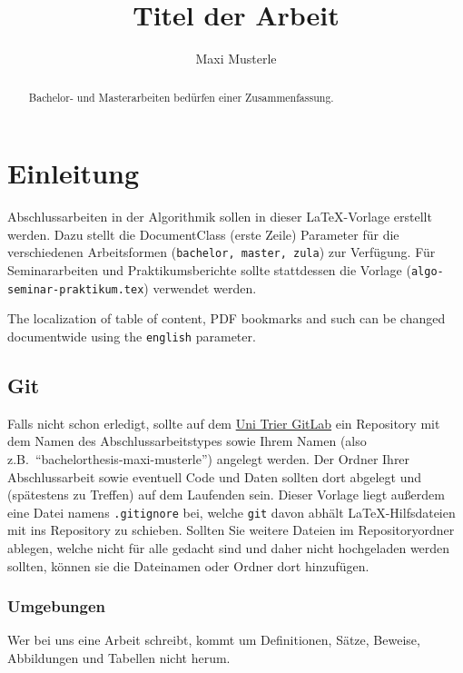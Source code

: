 \documentclass[bachelor,german]{algothesis}
\title{Titel der Arbeit} %
\author{Maxi Musterle} %
\begin{document}
\begin{abstract}
	Bachelor- und Masterarbeiten bedürfen einer Zusammenfassung.
\end{abstract}



\thesistableofcontents




\chapter{Einleitung}
Abschlussarbeiten in der Algorithmik sollen in dieser \LaTeX{}-Vorlage erstellt werden.
Dazu stellt die DocumentClass (erste Zeile) Parameter für die verschiedenen Arbeitsformen
(\verb+bachelor, master, zula+) 
zur Verfügung.
Für Seminararbeiten und Praktikumsberichte sollte stattdessen die Vorlage (\verb+algo-seminar-praktikum.tex+) verwendet werden.

The localization of table of content, PDF bookmarks and such can be changed documentwide using the \verb+english+ parameter.


\section{Git}
Falls nicht schon erledigt, sollte auf dem \href{https://gitlab.uni-trier.de/}{Uni Trier GitLab} ein Repository mit dem Namen des Abschlussarbeitstypes sowie Ihrem Namen (also z.B.\ ``bachelorthesis-maxi-musterle'') angelegt werden. Der Ordner Ihrer Abschlussarbeit sowie eventuell Code und Daten sollten dort abgelegt und (spätestens zu Treffen) auf dem Laufenden sein. 
Dieser Vorlage liegt außerdem eine Datei namens \verb+.gitignore+ bei, welche \texttt{git} davon abhält \LaTeX{}-Hilfsdateien mit ins Repository zu schieben. 
Sollten Sie weitere Dateien im Repositoryordner ablegen, welche nicht für alle gedacht sind und daher nicht hochgeladen werden sollten, können sie die Dateinamen oder Ordner dort hinzufügen. 



\subsection{Umgebungen}
Wer bei uns eine Arbeit schreibt, kommt um Definitionen, Sätze, Beweise, Abbildungen und Tabellen nicht herum.
\end{document}
